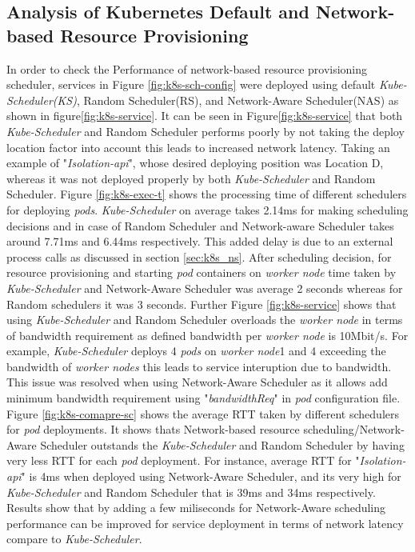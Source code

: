 \subsection{Analysis of Kubernetes Default and Network-based Resource Provisioning}
\label{sec:analysis}
In order to check the Performance of network-based resource provisioning scheduler, services in Figure \ref{fig:k8s-sch-config} were deployed using default \emph{Kube-Scheduler(KS)}, Random Scheduler(RS), and Network-Aware Scheduler(NAS) as shown in figure\ref{fig:k8s-service}\cite{Santos2019}. It can be seen in Figure\ref{fig:k8s-service} that both \emph{Kube-Scheduler} and Random Scheduler performs poorly by not taking the deploy location factor into account this leads to increased network latency\cite{Santos2019}. Taking an example of "\emph{Isolation-api}", whose desired deploying position was Location D, whereas it was not deployed properly by both \emph{Kube-Scheduler} and Random Scheduler\cite{Santos2019}. Figure \ref{fig:k8s-exec-t} shows the processing time of different schedulers for deploying \emph{pods}. \emph{Kube-Scheduler} on average takes 2.14ms for making scheduling decisions and in case of Random Scheduler and Network-aware Scheduler takes around 7.71ms and 6.44ms respectively\cite{Santos2019}. This added delay is due to an external process calls as discussed in section \ref{sec:k8s_ns}. After scheduling decision, for resource provisioning and starting \emph{pod} containers on \emph{worker node} time taken by \emph{Kube-Scheduler} and Network-Aware Scheduler was average 2 seconds whereas for Random schedulers it was 3 seconds\cite{Santos2019}. Further Figure \ref{fig:k8s-service} shows that using \emph{Kube-Scheduler} and Random Scheduler overloads the \emph{worker node} in terms of bandwidth requirement as defined bandwidth per \emph{worker node} is 10Mbit/s\cite{Santos2019}. For example, \emph{Kube-Scheduler} deploys 4 \emph{pods} on \emph{worker node}1 and 4 exceeding the bandwidth of \emph{worker nodes} this leads to service interuption due to bandwidth\cite{Santos2019}. This issue was resolved when using Network-Aware Scheduler as it allows add minimum bandwidth requirement using "\emph{bandwidthReq}" in \emph{pod} configuration file\cite{Santos2019}. Figure \ref{fig:k8s-comapre-sc} shows the average RTT taken by different schedulers for \emph{pod} deployments. It shows thats Network-based resource scheduling/Network-Aware Scheduler outstands the \emph{Kube-Scheduler} and Random Scheduler by having very less RTT for each \emph{pod} deployment\cite{Santos2019}. For instance, average RTT for "\emph{Isolation-api}" is 4ms when deployed using Network-Aware Scheduler, and its very high for \emph{Kube-Scheduler} and Random Scheduler that is 39ms and 34ms respectively\cite{Santos2019}. Results show that by adding a few miliseconds for Network-Aware scheduling performance can be improved for service deployment in terms of network latency compare to \emph{Kube-Scheduler}\cite{Santos2019}.
